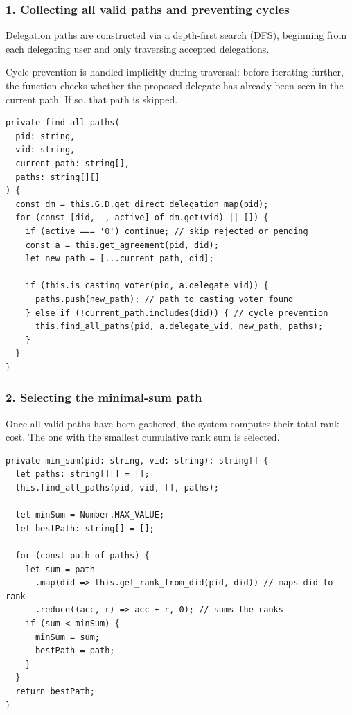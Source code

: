 \subsubsection*{1. Collecting all valid paths and preventing cycles}

Delegation paths are constructed via a depth-first search (DFS), beginning from each delegating user and only traversing accepted delegations.

Cycle prevention is handled implicitly during traversal: before iterating further, the function checks whether the proposed delegate has already been seen in the current path. If so, that path is skipped.

\begin{verbatim}
private find_all_paths(
  pid: string,
  vid: string,
  current_path: string[],
  paths: string[][]
) {
  const dm = this.G.D.get_direct_delegation_map(pid);
  for (const [did, _, active] of dm.get(vid) || []) {
    if (active === '0') continue; // skip rejected or pending
    const a = this.get_agreement(pid, did);
    let new_path = [...current_path, did];

    if (this.is_casting_voter(pid, a.delegate_vid)) {
      paths.push(new_path); // path to casting voter found
    } else if (!current_path.includes(did)) { // cycle prevention
      this.find_all_paths(pid, a.delegate_vid, new_path, paths);
    }
  }
}
\end{verbatim}

\subsubsection*{2. Selecting the minimal-sum path}

Once all valid paths have been gathered, the system computes their total rank cost. The one with the smallest cumulative rank sum is selected.

\begin{verbatim}
private min_sum(pid: string, vid: string): string[] {
  let paths: string[][] = [];
  this.find_all_paths(pid, vid, [], paths);

  let minSum = Number.MAX_VALUE;
  let bestPath: string[] = [];

  for (const path of paths) {
    let sum = path
      .map(did => this.get_rank_from_did(pid, did)) // maps did to rank
      .reduce((acc, r) => acc + r, 0); // sums the ranks
    if (sum < minSum) {
      minSum = sum;
      bestPath = path;
    }
  }
  return bestPath;
}
\end{verbatim}

